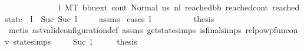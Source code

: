 \begin{isabellebody}
\ \ \ \ \ \ \ \ \ \ \ \ {\isacharparenleft}{\kern0pt}{\isasymexists}\ l{}{\isachardot}{\kern0pt}\ {\isacharparenleft}{\kern0pt}M{\isacharcomma}{\kern0pt}{\isasymLambda}{\isacharcomma}{\kern0pt}{\isasymGamma}{\isacharcomma}{\kern0pt}{\isasymOmega}{\isacharcomma}{\kern0pt}T\ {\isasymturnstile}{\isacharparenleft}{\kern0pt}bb{\isacharunderscore}{\kern0pt}next{\isacharcomma}{\kern0pt}\ cont{}{\isacharcomma}{\kern0pt}\ Normal\ ns{}{\isacharparenright}{\kern0pt}\ {\isacharminus}{\kern0pt}n{\isasymlongrightarrow}{\isacharcircum}{\kern0pt}l{}\ {\isacharparenleft}{\kern0pt}reached{\isacharunderscore}{\kern0pt}bb{\isacharcomma}{\kern0pt}\ reached{\isacharunderscore}{\kern0pt}cont{\isacharcomma}{\kern0pt}\ reached{\isacharunderscore}{\kern0pt}state{\isacharparenright}{\kern0pt}{\isacharparenright}{\kern0pt}\ {\isasymand}\ {\isacharparenleft}{\kern0pt}l\ {\isacharequal}{\kern0pt}\ Suc\ {\isacharparenleft}{\kern0pt}Suc\ l{}{\isacharparenright}{\kern0pt}{\isacharparenright}{\kern0pt}\ {\isacharparenright}{\kern0pt}{\isachardoublequoteclose}\isanewline
%
\isadelimproof
\ \ %
\endisadelimproof
%
\isatagproof
{}\isamarkupfalse%
\ assms\isanewline
{}\isamarkupfalse%
\ {\isacharparenleft}{\kern0pt}cases\ l{\isacharparenright}{\kern0pt}\isanewline
\ \ \isamarkupfalse%
\ {}\isanewline
\ \ \isamarkupfalse%
\ \isamarkupfalse%
\ {\isacharquery}{\kern0pt}thesis\ \isamarkupfalse%
\ {\isacharparenleft}{\kern0pt}metis\ ast{\isacharunderscore}{\kern0pt}valid{\isacharunderscore}{\kern0pt}configuration{\isacharunderscore}{\kern0pt}def\ assms{\isacharparenleft}{\kern0pt}{}{\isacharparenright}{\kern0pt}\ get{\isacharunderscore}{\kern0pt}state{\isachardot}{\kern0pt}simps\ is{\isacharunderscore}{\kern0pt}final{\isachardot}{\kern0pt}simps{\isacharparenleft}{\kern0pt}{}{\isacharparenright}{\kern0pt}\ relpowp{\isacharunderscore}{\kern0pt}fun{\isacharunderscore}{\kern0pt}conv\ state{\isachardot}{\kern0pt}simps{\isacharparenleft}{\kern0pt}{}{\isacharparenright}{\kern0pt}{\isacharparenright}{\kern0pt}\isanewline
{}\isamarkupfalse%
\isanewline
\ \ \isamarkupfalse%
\ {}{\isacharcolon}{\kern0pt}\ {\isacharparenleft}{\kern0pt}Suc\ l{}{\isacharparenright}{\kern0pt}\isanewline
\ \ \isamarkupfalse%
\ \isamarkupfalse%
\ {\isacharquery}{\kern0pt}thesis\ \isanewline
\ \ \isamarkupfalse%

\end{isabellebody}
